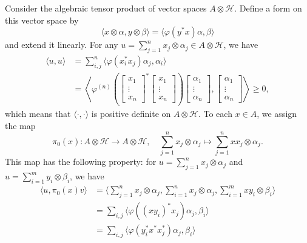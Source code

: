 \begin{myproof}
    Consider the algebraic tensor product of vector spaces $A \otimes \mathcal{H}$.
    Define a form on this vector space by
    $$\langle x \otimes \alpha, y \otimes \beta \rangle = \langle \varphi(y^* x) \alpha, \beta\rangle$$
    and extend it linearly. For any $u = \sum_{j = 1} ^n x_j \otimes \alpha_j \in A \otimes \mathcal{H}$, we have 
    \begin{align*}
        \langle u, u \rangle &= \sum_{i, j} ^n \langle \varphi(x_i ^* x_j) \alpha_j, \alpha_i \rangle\\
        &= \left\langle \varphi^{(n)} \left(\begin{bmatrix}
            x_1 \\ \vdots \\ x_n
        \end{bmatrix}^* \begin{bmatrix}
            x_1 \\ \vdots \\ x_n
        \end{bmatrix}\right) \begin{bmatrix}
            \alpha_1 \\ \vdots \\ \alpha_n
        \end{bmatrix}, \begin{bmatrix}
            \alpha_1 \\ \vdots \\ \alpha_n
        \end{bmatrix} \right\rangle \geq 0,
    \end{align*}
    which means that $\langle \cdot, \cdot \rangle$ is positive definite on $A \otimes \mathcal{H}$. To each $x \in A$, we assign the map 
    $$\pi_0 (x): A \otimes \mathcal{H} \to A \otimes \mathcal{H},\quad \sum_{j = 1} ^n x_j \otimes \alpha_j \mapsto \sum_{j = 1} ^n x x_j \otimes \alpha_j.$$
    This map has the following property: for $u = \sum_{j = 1} ^n x_j \otimes \alpha_j$ and $u = \sum_{i = 1} ^m y_i \otimes \beta_i$, we have
    \begin{align}
        \langle u, \pi_0 (x) v \rangle &= \langle \sum_{j = 1} ^n x_j \otimes \alpha_j, \sum_{i = 1} ^n x_j \otimes \alpha_j, \sum_{i = 1} ^m x y_i \otimes \beta_i \rangle \nonumber\\ 
        &= \sum_{i, j} \langle \varphi((x y_i)^* x_j)\alpha_j, \beta_i \rangle \nonumber\\
        &= \sum_{i, j} \langle \varphi (y_i ^* x^* x_j ^*) \alpha_j, \beta_i \rangle \nonumber\\

\end{align}
\end{myproof}

